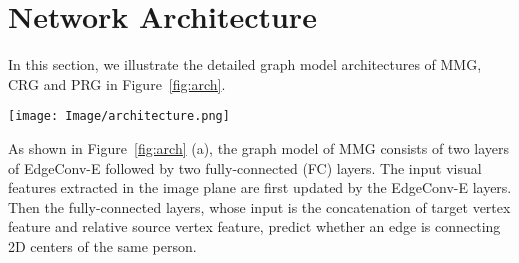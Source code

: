 \documentclass[10pt,twocolumn,letterpaper]{article}
\begin{document}
\begin{table}[h]
    \centering
    \caption{Generalization to different number of camera views. All results are obtained using ResNet-50 as the backbone.  means the higher score the better, while  means the lower the better.  means fine-tuning models under the test-time camera setups.}
    \vspace{0.2cm}
    \label{tab:compare_panoptic}
\end{table}


\section{Network Architecture}

In this section, we illustrate the detailed graph model architectures of MMG, CRG and PRG in Figure~\ref{fig:arch}.

\begin{figure*}[th]
	\centering
	\texttt{[image: Image/architecture.png]}
	\caption{The model architectures of (a) MMG, (b) CRG and (c) PRG. `Linear' denotes the fully-connected layer, and `MaxPool' denotes the graph max-pooling layer. The input feature dimensions and the output feature dimensions are illustrated.}
	\label{fig:arch}
\end{figure*}


As shown in Figure~\ref{fig:arch} (a), the graph model of MMG consists of two layers of EdgeConv-E followed by two fully-connected (FC) layers. The input visual features  extracted in the image plane are first updated by the EdgeConv-E layers. Then the fully-connected layers, whose input is the concatenation of target vertex feature and relative source vertex feature, predict whether an edge is connecting 2D centers of the same person. 
\end{document}
